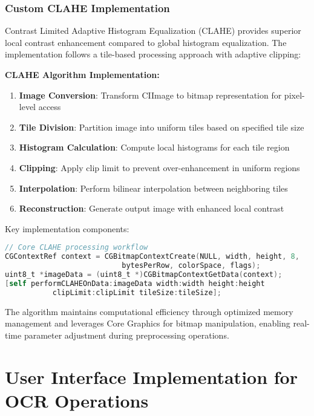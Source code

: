 \subsubsection{Custom CLAHE Implementation}

Contrast Limited Adaptive Histogram Equalization (CLAHE) provides superior local contrast enhancement compared to global histogram equalization. The implementation follows a tile-based processing approach with adaptive clipping:

\textbf{CLAHE Algorithm Implementation:}
\begin{enumerate}
\item \textbf{Image Conversion}: Transform CIImage to bitmap representation for pixel-level access
\item \textbf{Tile Division}: Partition image into uniform tiles based on specified tile size
\item \textbf{Histogram Calculation}: Compute local histograms for each tile region
\item \textbf{Clipping}: Apply clip limit to prevent over-enhancement in uniform regions
\item \textbf{Interpolation}: Perform bilinear interpolation between neighboring tiles
\item \textbf{Reconstruction}: Generate output image with enhanced local contrast
\end{enumerate}

Key implementation components:
\begin{lstlisting}[language=C,basicstyle=\footnotesize\ttfamily,frame=single,breaklines=true,columns=flexible]
// Core CLAHE processing workflow
CGContextRef context = CGBitmapContextCreate(NULL, width, height, 8, 
                           bytesPerRow, colorSpace, flags);
uint8_t *imageData = (uint8_t *)CGBitmapContextGetData(context);
[self performCLAHEOnData:imageData width:width height:height 
           clipLimit:clipLimit tileSize:tileSize];
\end{lstlisting}

The algorithm maintains computational efficiency through optimized memory management and leverages Core Graphics for bitmap manipulation, enabling real-time parameter adjustment during preprocessing operations.

\section{User Interface Implementation for OCR Operations}

